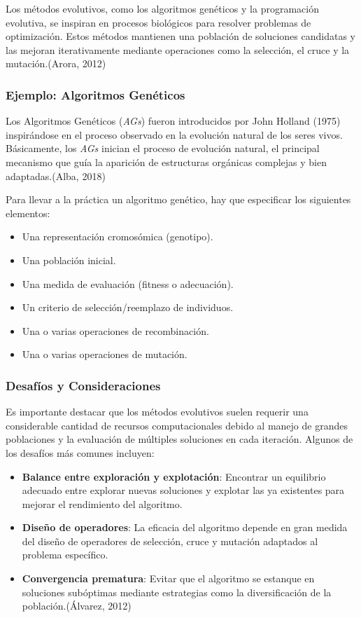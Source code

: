 	Los métodos evolutivos, como los algoritmos genéticos y la programación evolutiva, se inspiran en procesos biológicos para resolver problemas de optimización. Estos métodos mantienen una población de soluciones candidatas y las mejoran iterativamente mediante operaciones como la selección, el cruce y la mutación.(Arora, 2012) 
	
	\subsubsection{Ejemplo: Algoritmos Genéticos}
	Los Algoritmos Genéticos (\textit{AGs}) fueron introducidos por John Holland (1975) inspirándose en el proceso observado en la evolución natural de los seres vivos. Básicamente, los \textit{AGs} inician el proceso de evolución natural, el principal mecanismo que guía la aparición de estructuras orgánicas complejas y bien adaptadas.(Alba, 2018) 
	
	Para llevar a la práctica un algoritmo genético, hay que especificar los siguientes elementos:
	
	\begin{itemize}
		\item Una representación cromosómica (genotipo).
		\item Una población inicial.
		\item Una medida de evaluación (fitness o adecuación).
		\item Un criterio de selección/reemplazo de individuos.
		\item Una o varias operaciones de recombinación.
		\item Una o varias operaciones de mutación.
	\end{itemize}
	
	\subsubsection{Desafíos y Consideraciones}
	Es importante destacar que los métodos evolutivos suelen requerir una considerable cantidad de recursos computacionales debido al manejo de grandes poblaciones y la evaluación de múltiples soluciones en cada iteración. Algunos de los desafíos más comunes incluyen:
	
	\begin{itemize}
		\item \textbf{Balance entre exploración y explotación}: Encontrar un equilibrio adecuado entre explorar nuevas soluciones y explotar las ya existentes para mejorar el rendimiento del algoritmo.
		\item \textbf{Diseño de operadores}: La eficacia del algoritmo depende en gran medida del diseño de operadores de selección, cruce y mutación adaptados al problema específico.
		\item \textbf{Convergencia prematura}: Evitar que el algoritmo se estanque en soluciones subóptimas mediante estrategias como la diversificación de la población.(Álvarez, 2012) 
	\end{itemize}
	
